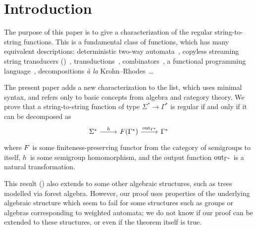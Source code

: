 \section{Introduction}
\label{sec:intro}

The purpose of this paper is to give a characterization of the regular string-to-string functions. This is a fundamental class of functions, which has many equivalent descriptions: deterministic two-way automata~\cite[Note~4]{shepherdson1959reduction}, copyless streaming string transducers (\sst)~\cite[Section~3]{alurExpressivenessStreamingString2010}, \mso transductions~\cite[Theorem~13]{engelfrietMSODefinableString2001}, combinators~\cite[Section~2]{alur2014regular}, a functional programming language~\cite[Section~6]{bojanczykRegularFirstOrderList2018}, decompositions \textit{à la} Krohn--Rhodes~\cite[Theorem~18, item~4]{bojanczykstefanski2020}\ldots


The present paper adds a new characterization to the list, which uses minimal syntax, and refers only to basic concepts from algebra and category theory. We prove that a string-to-string function of type $\Sigma^* \to \Gamma^*$ is regular
if and only if it can be decomposed as 
\[
\begin{tikzcd}
    \Sigma^* 
    \ar[r,"h"]
    & 
    \functor(\Gamma^*)
    \ar[r,"\outfun_{\Gamma^*}"]
    &
    \Gamma^*
\end{tikzcd}
\]
where $\functor$ is some finiteness-preserving functor from the category of semigroups to itself, $h$~is some semigroup homomorphism, and the output function $\mathrm{out}_{\Gamma^*}$ is a natural transformation.

This result () also extends to some other algebraic structures, such as trees modelled via forest algebra. However, our proof uses properties of the underlying algebraic structure which seem to fail for some structures such as groups or algebras corresponding to weighted automata; we do not know if our proof can be extended to  these structures, or even if the theorem itself is true.

